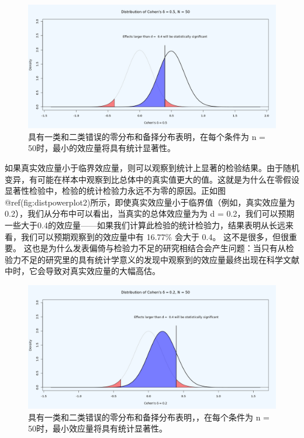\documentclass[
  letterpaper,
  DIV=11,
  numbers=noendperiod]{scrreprt}
\begin{document}
\begin{figure}

{\centering \includegraphics[width=1\textwidth,height=\textheight]{images/dpplot50.png}

}

\caption{\label{fig-distpowerplot1}具有一类和二类错误的零分布和备择分布表明，在每个条件为
n = 50时，最小的效应量将具有统计显著性。}

\end{figure}

如果真实效应量小于临界效应量，则可以观察到统计上显著的检验结果。由于随机变异，有可能在样本中观察到比总体中的真实值更大的值。这就是为什么在零假设显著性检验中，检验的统计检验力永远不为零的原因。正如图@ref(fig:distpowerplot2)所示，即使真实效应量小于临界值（例如，真实效应量为0.2），我们从分布中可以看出，当真实的总体效应量为为
d =
0.2，我们可以预期一些大于0.4的效应量------如果我们计算此检验的统计检验力，结果表明从长远来看，我们可以预期观察到的效应量中有
16.77\% 会大于 0.4。 这不是很多，但很重要。
这也是为什么发表偏倚与检验力不足的研究相结合会产生问题：当只有从检验力不足的研究里的具有统计学意义的发现中观察到的效应量最终出现在科学文献中时，它会导致对真实效应量的大幅高估。

\begin{figure}

{\centering \includegraphics[width=1\textwidth,height=\textheight]{images/dpplot502.png}

}

\caption{\label{fig-distpowerplot2}具有一类和二类错误的零分布和备择分布表明，，在每个条件为
n = 50时，最小效应量将具有统计显著性。}

\end{figure}
\end{document}

